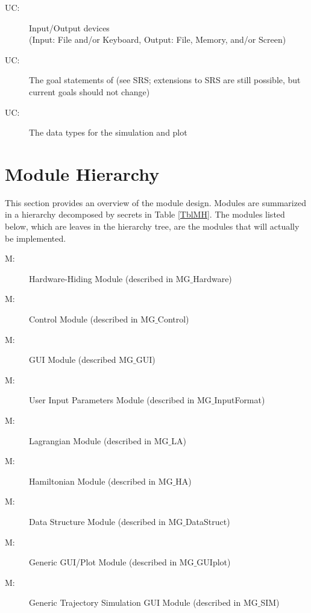 \documentclass[12pt, titlepage]{article}
\newcounter{ucnum}
\newcommand{\uctheucnum}{UC\theucnum}
\newcounter{mnum}
\newcommand{\mthemnum}{M\themnum}
\begin{document}
\begin{description}
\item[ \uctheucnum \label{ucIO}:] Input/Output devices\\
  (Input: File and/or Keyboard, Output: File, Memory, and/or Screen)
\item[ \uctheucnum \label{ucGoal}:] The goal statements 
 of \progname (see SRS; extensions to SRS are still possible, but current goals
 should not change)
\item[ \uctheucnum \label{ucData}:] The data types 
 for the simulation and plot 
\end{description}

\section{Module Hierarchy} \label{SecMH}

This section provides an overview of the module design. Modules are summarized
in a hierarchy decomposed by secrets in Table \ref{TblMH}. The modules listed
below, which are leaves in the hierarchy tree, are the modules that will
actually be implemented.

\begin{description}
\item [ \mthemnum \label{mHH}:] Hardware-Hiding Module 
(described in MG$\_$Hardware)
\item [ \mthemnum \label{mHH}:] \progname Control Module 
(described in MG$\_$Control)
\item [ \mthemnum \label{mHH}:] \progname GUI Module 
(described MG$\_$GUI)
\item [ \mthemnum \label{mHH}:] User Input Parameters 
Module (described in MG$\_$InputFormat)
\item [ \mthemnum \label{mHH}:] Lagrangian Module 
(described in MG$\_$LA)
\item [ \mthemnum \label{mHH}:] Hamiltonian Module 
(described in MG$\_$HA)
\item [ \mthemnum \label{mHH}:] Data Structure Module 
(described in MG$\_$DataStruct)
\item [ \mthemnum \label{mHH}:] Generic GUI/Plot Module 
(described in MG$\_$GUIplot)
\item [ \mthemnum \label{mHH}:] Generic Trajectory 
Simulation GUI Module (described in MG$\_$SIM)
\end{description}
\end{document}
